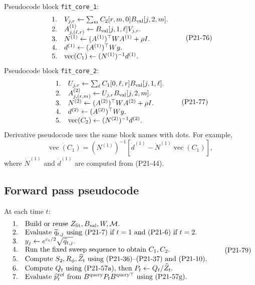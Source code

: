 \documentclass[11pt]{article}
\newcommand{\widehatZ}{\widehat Z}
\newcommand{\widehatp}{\widehat p}
\newcommand{\vecop}{\operatorname{vec}}
\begin{document}
Pseudocode block \texttt{fit\_core\_1}:
\[
\begin{array}{ll}
1. & V_{j,r}\leftarrow \sum_m C_2[r,m,0]B_{\rm val}[j,2,m].\\
2. & A^{(1)}_{j,(\ell,r)}
   \leftarrow B_{\rm val}[j,1,\ell]V_{j,r}.\\
3. & N^{(1)}\leftarrow (A^{(1)})^\top W A^{(1)}+\rho I.\\
4. & d^{(1)}\leftarrow (A^{(1)})^\top W y.\\
5. & \vecop(C_1)\leftarrow (N^{(1)})^{-1}d^{(1)}.
\end{array}
\tag{P21-76}
\]
Pseudocode block \texttt{fit\_core\_2}:
\[
\begin{array}{ll}
1. & U_{j,r}\leftarrow \sum_\ell C_1[0,\ell,r]B_{\rm val}[j,1,\ell].\\
2. & A^{(2)}_{j,(r,m)}
   \leftarrow U_{j,r}B_{\rm val}[j,2,m].\\
3. & N^{(2)}\leftarrow (A^{(2)})^\top W A^{(2)}+\rho I.\\
4. & d^{(2)}\leftarrow (A^{(2)})^\top W y.\\
5. & \vecop(C_2)\leftarrow (N^{(2)})^{-1}d^{(2)}.
\end{array}
\tag{P21-77}
\]
Derivative pseudocode uses the same block names with dots.  For example,
\[
    \dot{\vecop(C_1)}
    =
    (N^{(1)})^{-1}
    \left[
    \dot d^{(1)}-\dot N^{(1)}\vecop(C_1)
    \right],
    \tag{P21-78}
\]
where \(\dot N^{(1)}\) and \(\dot d^{(1)}\) are computed from (P21-44).

\subsection{Forward pass pseudocode}

At each time \(t\):
\[
\begin{array}{ll}
1. & \text{Build or reuse } Z_{\rm fit},B_{\rm val},W,\mathcal M.\\
2. & \text{Evaluate } \widetilde q_{t,j} \text{ using (P21-7) if }t=1
     \text{ and (P21-6) if }t=2.\\
3. & y_j\leftarrow e^{c_t/2}\sqrt{\widetilde q_{t,j}}.\\
4. & \text{Run the fixed sweep sequence to obtain } C_1,C_2.\\
5. & \text{Compute } S_2,R_\phi,\widehatZ_t
     \text{ using (P21-36)--(P21-37) and (P21-10).}\\
6. & \text{Compute } Q_t \text{ using (P21-57a), then }
     P_t\leftarrow Q_t/\widehatZ_t.\\
7. & \text{Evaluate }\widehatp_t^{\rm ref}
     \text{ from }B^{\rm query}P_tB^{\rm query\top}
     \text{ using (P21-57g).}
\end{array}
\tag{P21-79}
\]
\end{document}
